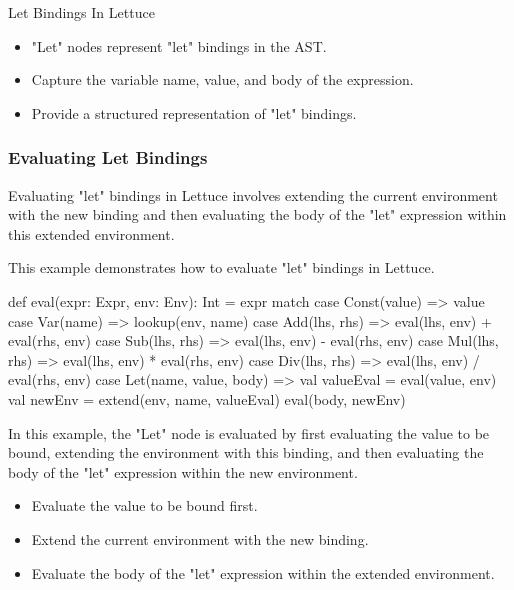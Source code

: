 \begin{notes}{Let Bindings In Lettuce}
\begin{highlight}
        \begin{itemize}
            \item "Let" nodes represent "let" bindings in the AST.
            \item Capture the variable name, value, and body of the expression.
            \item Provide a structured representation of "let" bindings.
        \end{itemize}
    
    \end{highlight}
    
    \subsubsection*{Evaluating Let Bindings}
    
    Evaluating "let" bindings in Lettuce involves extending the current environment with the new binding and then evaluating the body of the "let" expression within this extended environment.
    
    \begin{highlight}
    
        This example demonstrates how to evaluate "let" bindings in Lettuce.
    
    \begin{code}[Scala]
    def eval(expr: Expr, env: Env): Int = expr match {
        case Const(value) => value
        case Var(name) => lookup(env, name)
        case Add(lhs, rhs) => eval(lhs, env) + eval(rhs, env)
        case Sub(lhs, rhs) => eval(lhs, env) - eval(rhs, env)
        case Mul(lhs, rhs) => eval(lhs, env) * eval(rhs, env)
        case Div(lhs, rhs) => eval(lhs, env) / eval(rhs, env)
        case Let(name, value, body) => 
            val valueEval = eval(value, env)
            val newEnv = extend(env, name, valueEval)
            eval(body, newEnv)
    }
    \end{code}
    
        In this example, the "Let" node is evaluated by first evaluating the value to be bound, extending the environment with this binding, and then evaluating the body of the "let" expression 
        within the new environment.
    
        \begin{itemize}
            \item Evaluate the value to be bound first.
            \item Extend the current environment with the new binding.
            \item Evaluate the body of the "let" expression within the extended environment.
        \end{itemize}
    

\end{highlight}
\end{notes}
